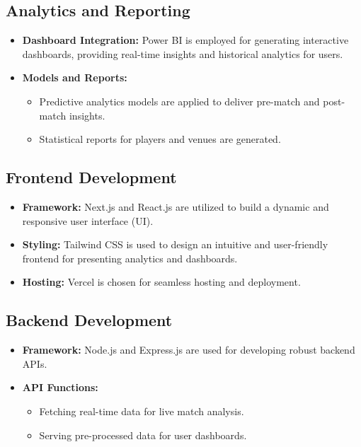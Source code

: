 \subsection{Analytics and Reporting}
\begin{itemize}
    \item \textbf{Dashboard Integration:} Power BI is employed for generating interactive dashboards, providing real-time insights and historical analytics for users.
    \item \textbf{Models and Reports:}
    \begin{itemize}
        \item Predictive analytics models are applied to deliver pre-match and post-match insights.
        \item Statistical reports for players and venues are generated.
    \end{itemize}
\end{itemize}

\subsection{Frontend Development}
\begin{itemize}
    \item \textbf{Framework:} Next.js and React.js are utilized to build a dynamic and responsive user interface (UI).
    \item \textbf{Styling:} Tailwind CSS is used to design an intuitive and user-friendly frontend for presenting analytics and dashboards.
    \item \textbf{Hosting:} Vercel is chosen for seamless hosting and deployment.
\end{itemize}

\subsection{Backend Development}
\begin{itemize}
    \item \textbf{Framework:} Node.js and Express.js are used for developing robust backend APIs.
    \item \textbf{API Functions:}
    \begin{itemize}
        \item Fetching real-time data for live match analysis.
        \item Serving pre-processed data for user dashboards.
    \end{itemize}
\end{itemize}

